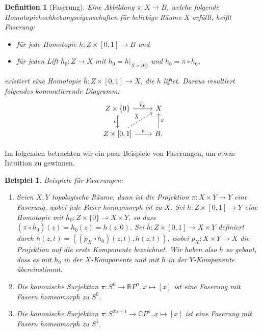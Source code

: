 \documentclass[12pt, hidelinks]{article}
\numberwithin{conj}{section}
\newtheorem{definition}[conj]{Definition}
\newtheorem{example}[conj]{Beispiel}
\begin{document}
\begin{definition}[Faserung]
Eine Abbildung $\pi: X \to B$, welche folgende Homotopiehochhebungseigenschaften für beliebige Räume $X$ erfüllt, heißt Faserung:
\begin{itemize}[noitemsep]
    \item für jede Homotopie $h: Z \times [0,1] \to B$ und
    \item für jeden Lift $\overline{h}_0: Z \to X$ mit $h_0 = h\vert_{X\times \{0\}}$ und $h_0 = \pi \circ \overline{h}_0$,
\end{itemize}
existiert eine Homotopie $\overline{h}: Z \times [0,1] \to X$, die $h$ liftet. Daraus resultiert folgendes kommutierende Diagramm:
\[\begin{tikzcd}
    {Z \times \{0\}} & X \\
    {Z\times[0,1]} & B.
    \arrow["{\overline{h}_0}", from=1-1, to=1-2]
    \arrow["\iota"', hook, from=1-1, to=2-1]
    \arrow["{\overline{h}}", dashed, from=2-1, to=1-2]
    \arrow["h", from=2-1, to=2-2]
    \arrow["\pi"', from=2-2, to=1-2]
\end{tikzcd}\]
\end{definition}
Im folgenden betrachten wir ein paar Beispiele von Faserungen, um etwas Intuition zu gewinnen.
\begin{example} Beispiele für Faserungen:
\begin{enumerate}[nolistsep]
    \item Seien $X,Y$ topologische Räume, dann ist die Projektion $\pi: X \times Y \to Y$ eine Faserung, wobei jede Faser homeomorph ist zu $X$. Sei $h: Z \times [0,1] \to Y$ eine Homotopie mit $\overline{h}_0: Z \times \{0\} \to X \times Y$, so dass $(\pi \circ \overline{h}_0)(z) = h_0(z) = h(z,0)$. Sei $\overline{h}: Z \times [0,1] \to X \times Y$ definiert durch $\overline{h}(z,t) = ((p_X \circ \overline{h}_0)(z,t), h(z,t))$, wobei $p_X: X \times Y \to X$ die Projektion auf die erste Komponente bezeichnet. Wir haben also $\overline{h}$ so gebaut, dass es mit $\overline{h}_0$ in der $X$-Komponente und mit $h$ in der $Y$-Komponente übereinstimmt.
    \item Die kanonische Surjektion $\pi: S^n \to \mathbb{R}P^n, x \mapsto [x]$ ist eine Faserung mit Fasern homeomorph zu $S^0$.
    \item Die kanonische Surjektion $\pi: S^{2n+1} \to \mathbb{C}P^n, x \mapsto [x]$ ist eine Faserung mit Fasern homeomorph zu $S^1$.
\end{enumerate}
\end{example}
\end{document}
